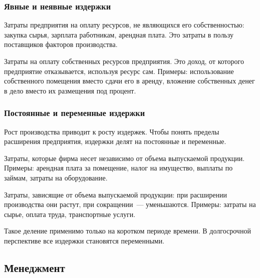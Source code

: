 \documentclass[12pt]{article}
\begin{document}
	\subsubsection{Явные и неявные издержки}

	\begin{definition}
		Затраты предприятия на оплату ресурсов, не являющихся его собственностью: закупка сырья, зарплата работникам, арендная плата. Это затраты в пользу поставщиков факторов производства.
	\end{definition}

	\begin{definition}
		Затраты на оплату собственных ресурсов предприятия. Это доход, от которого предприятие отказывается, используя ресурс сам. Примеры: использование собственного помещения вместо сдачи его в аренду, вложение собственных денег в дело вместо их размещения под процент.
	\end{definition}

	\subsubsection{Постоянные и переменные издержки}

	\noindent
	Рост производства приводит к росту издержек. Чтобы понять пределы расширения предприятия, издержки делят на постоянные и переменные.

	\begin{definition}
		Затраты, которые фирма несет независимо от объема выпускаемой продукции. Примеры: арендная плата за помещение, налог на имущество, выплаты по займам, затраты на оборудование.
	\end{definition}

	\begin{definition}
		Затраты, зависящие от объема выпускаемой продукции: при расширении производства они растут, при сокращении~--- уменьшаются. Примеры: затраты на сырье, оплата труда, транспортные услуги.
	\end{definition}

	\begin{note}
		Такое деление применимо только на коротком периоде времени. В долгосрочной перспективе все издержки становятся переменными.
	\end{note}

	\subsection{Менеджмент}
\end{document}
